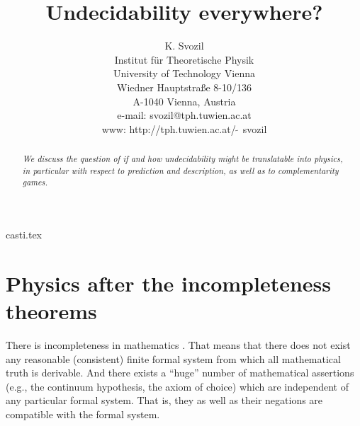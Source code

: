 \RequirePackage{mathptm}
\RequirePackage{times}



\title{Undecidability everywhere?}
\author{K. Svozil\\
 {\small Institut f\"ur Theoretische Physik}  \\
  {\small University of Technology Vienna }     \\
  {\small Wiedner Hauptstra\ss e 8-10/136}    \\
  {\small A-1040 Vienna, Austria   }            \\
  {\small e-mail: svozil@tph.tuwien.ac.at}\\
  {\small www: http://tph.tuwien.ac.at/$\widetilde{\;\;}\,$svozil}}
\date{ }
\maketitle

\begin{flushright}
{\scriptsize casti.tex}
\end{flushright}

\begin{abstract}
{\em We discuss the question of if and how undecidability
might be translatable into physics, in particular with respect to
prediction and description, as well as to
complementarity games.}
\end{abstract}

\newpage

\section{Physics after the incompleteness theorems}

There is incompleteness in mathematics
\cite{godel1,tarski,turing,chaitin,calude,casti,rucker}. That means that
there does not
exist any reasonable (consistent) finite formal system from which all
mathematical truth is derivable.
And there exists a ``huge'' number \cite{calude-new}
of mathematical assertions (e.g., the continuum hypothesis, the axiom
of choice) which are independent of any
particular formal system. That is, they as well as their negations are
compatible with the formal system.

